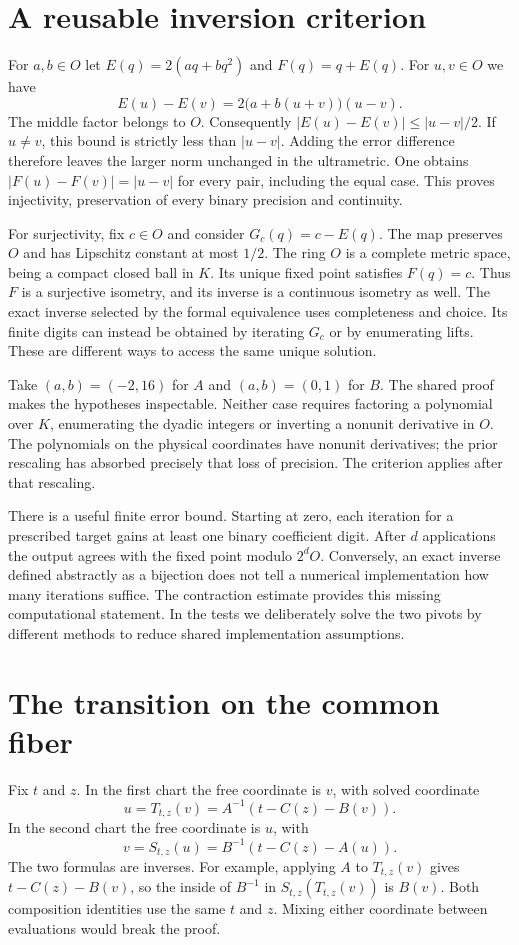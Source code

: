 \documentclass[12pt,letterpaper]{article}
\begin{document}
\section{A reusable inversion criterion}
For $a,b\in O$ let $E(q)=2(aq+bq^2)$ and $F(q)=q+E(q)$. For $u,v\in O$ we have
\[
 E(u)-E(v)=2\bigl(a+b(u+v)\bigr)(u-v).
\]
The middle factor belongs to $O$. Consequently $|E(u)-E(v)|\le |u-v|/2$. If $u\ne v$, this bound is strictly less than $|u-v|$. Adding the error difference therefore leaves the larger norm unchanged in the ultrametric. One obtains $|F(u)-F(v)|=|u-v|$ for every pair, including the equal case. This proves injectivity, preservation of every binary precision and continuity.

For surjectivity, fix $c\in O$ and consider $G_c(q)=c-E(q)$. The map preserves $O$ and has Lipschitz constant at most $1/2$. The ring $O$ is a complete metric space, being a compact closed ball in $K$. Its unique fixed point satisfies $F(q)=c$. Thus $F$ is a surjective isometry, and its inverse is a continuous isometry as well. The exact inverse selected by the formal equivalence uses completeness and choice. Its finite digits can instead be obtained by iterating $G_c$ or by enumerating lifts. These are different ways to access the same unique solution.

Take $(a,b)=(-2,16)$ for $A$ and $(a,b)=(0,1)$ for $B$. The shared proof makes the hypotheses inspectable. Neither case requires factoring a polynomial over $K$, enumerating the dyadic integers or inverting a nonunit derivative in $O$. The polynomials on the physical coordinates have nonunit derivatives; the prior rescaling has absorbed precisely that loss of precision. The criterion applies after that rescaling.

There is a useful finite error bound. Starting at zero, each iteration for a prescribed target gains at least one binary coefficient digit. After $d$ applications the output agrees with the fixed point modulo $2^d O$. Conversely, an exact inverse defined abstractly as a bijection does not tell a numerical implementation how many iterations suffice. The contraction estimate provides this missing computational statement. In the tests we deliberately solve the two pivots by different methods to reduce shared implementation assumptions.

\section{The transition on the common fiber}
Fix $t$ and $z$. In the first chart the free coordinate is $v$, with solved coordinate
\[
  u=T_{t,z}(v)=A^{-1}(t-C(z)-B(v)).
\]
In the second chart the free coordinate is $u$, with
\[
  v=S_{t,z}(u)=B^{-1}(t-C(z)-A(u)).
\]
The two formulas are inverses. For example, applying $A$ to $T_{t,z}(v)$ gives $t-C(z)-B(v)$, so the inside of $B^{-1}$ in $S_{t,z}(T_{t,z}(v))$ is $B(v)$. Both composition identities use the same $t$ and $z$. Mixing either coordinate between evaluations would break the proof.
\end{document}
